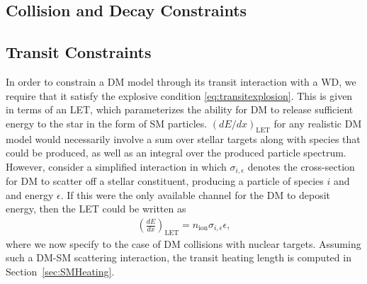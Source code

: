 \documentclass[twocolumn, preprintnumbers,amsmath,amssymb,prd, superscriptaddress]{revtex4}
\begin{document}
\subsection{Collision and Decay Constraints}
\label{sec:CollisionConstraints}


\subsection{Transit Constraints}
\label{sec:TransitConstraints}

In order to constrain a DM model through its transit interaction with a WD, we require that it satisfy the explosive condition \eqref{eq:transitexplosion}.
This is given in terms of an LET, which parameterizes the ability for DM to release sufficient energy to the star in the form of SM particles.
$(dE/dx)_\text{LET}$ for any realistic DM model would necessarily involve a sum over stellar targets along with species that could be produced, as well as an integral over the produced particle spectrum.
However, consider a simplified interaction in which $\sigma_{i,\epsilon}$ denotes the cross-section for DM to scatter off a stellar constituent, producing a particle of species $i$ and and energy $\epsilon$.
If this were the only available channel for the DM to deposit energy, then the LET could be written as
\begin{align}
\label{eq:schematicLET}
  \left( \frac{d E}{d x} \right)_\text{LET} = n_\text{ion} \sigma_{i,\epsilon} \epsilon,
\end{align}
where we now specify to the case of DM collisions with nuclear targets.
Assuming such a DM-SM scattering interaction, the transit heating length is computed in Section~\ref{sec:SMHeating}.
\end{document}
